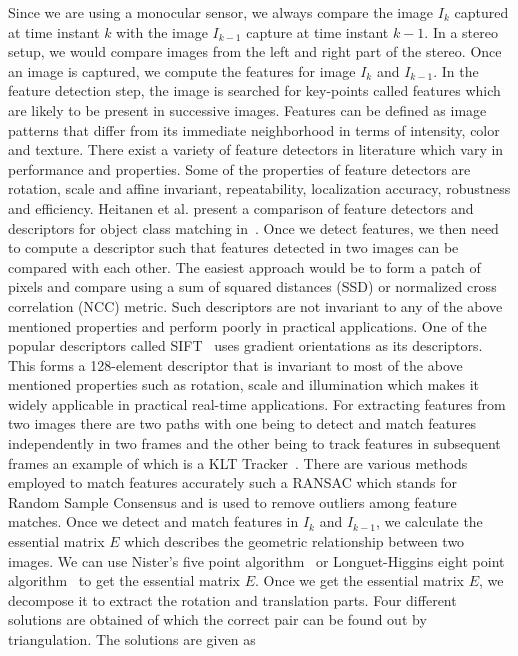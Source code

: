 Since we are using a monocular sensor, we always compare the image $I_k$ captured at time instant $k$ with the image $I_{k-1}$ capture at time instant $k-1$. In a stereo setup, we would compare images from the left and right part of the stereo. Once an image is captured, we compute the features for image $I_k$ and $I_{k-1}$. In the feature detection step, the image is searched for key-points called features  which are likely to be present in successive images. Features can be defined as image patterns that differ from its immediate neighborhood in terms of intensity, color and texture. There exist a variety of feature detectors in literature which vary in performance and properties. Some of the properties of feature detectors are rotation, scale and affine invariant, repeatability, localization accuracy, robustness and efficiency.  Heitanen et al. present a comparison of feature detectors and descriptors for object class matching in~\cite{hietanen2016comparison}. Once we detect features, we then need to compute a descriptor such that features detected in two images can be compared with each other. The easiest approach would be to form a patch of pixels and compare using a sum of squared distances (SSD) or normalized cross correlation (NCC) metric. Such descriptors are not invariant to any of the above mentioned properties and perform poorly in practical applications. One of the popular descriptors called SIFT~\cite{lowe2004distinctive} uses gradient orientations as its descriptors. This forms a 128-element descriptor that is invariant to most of the above mentioned properties such as rotation, scale and illumination which makes it widely applicable in practical real-time applications. For extracting features from two images there are two paths with one being to detect and match features independently in two frames and the other being to track features in subsequent frames an example of which is a KLT Tracker~\cite{tomasi1991detection}. There are various methods employed to match features accurately such a RANSAC which stands for Random Sample Consensus and is used to remove outliers among feature matches. Once we detect and match features in $I_k$ and $I_{k-1}$, we calculate the essential matrix $E$ which describes the geometric relationship between two images. We can use Nister’s five point algorithm~\cite{nister2004efficient} or Longuet-Higgins eight point algorithm~\cite{longuet1981computer} to get the essential matrix $E$. Once we get the essential matrix $E$, we decompose it to extract the rotation and translation parts. Four different solutions are obtained of which the correct pair can be found out by triangulation. The solutions are given as

